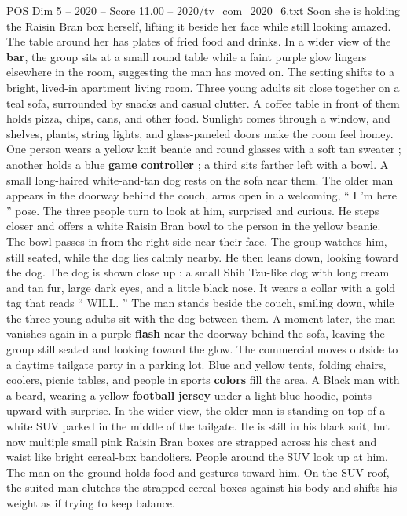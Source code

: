 \begin{textsample}{POS Dim 5 – 2020 – Score 11.00 – 2020/tv\_com\_2020\_6.txt}
Soon she is holding the Raisin Bran box herself, lifting it beside her face while still looking amazed.
The table around her has plates of fried food and drinks.
In a wider view of the \textbf{bar}, the group sits at a small round table while a faint purple glow lingers elsewhere in the room, suggesting the man has moved on.
The setting shifts to a bright, lived-in apartment living room.
Three young adults sit close together on a teal sofa, surrounded by snacks and casual clutter.
A coffee table in front of them holds pizza, chips, cans, and other food.
Sunlight comes through a window, and shelves, plants, string lights, and glass-paneled doors make the room feel homey.
One person wears a yellow knit beanie and round glasses with a soft tan sweater ; another holds a blue \textbf{game} \textbf{controller} ; a third sits farther left with a bowl.
A small long-haired white-and-tan dog rests on the sofa near them.
The older man appears in the doorway behind the couch, arms open in a welcoming, “ I ’m here ” pose.
The three people turn to look at him, surprised and curious.
He steps closer and offers a white Raisin Bran bowl to the person in the yellow beanie.
The bowl passes in from the right side near their face.
The group watches him, still seated, while the dog lies calmly nearby.
He then leans down, looking toward the dog.
The dog is shown close up : a small Shih Tzu-like dog with long cream and tan fur, large dark eyes, and a little black nose.
It wears a collar with a gold tag that reads “ WILL. ” The man stands beside the couch, smiling down, while the three young adults sit with the dog between them.
A moment later, the man vanishes again in a purple \textbf{flash} near the doorway behind the sofa, leaving the group still seated and looking toward the glow.
The commercial moves outside to a daytime tailgate party in a parking lot.
Blue and yellow tents, folding chairs, coolers, picnic tables, and people in sports \textbf{colors} fill the area.
A Black man with a beard, wearing a yellow \textbf{football} \textbf{jersey} under a light blue hoodie, points upward with surprise.
In the wider view, the older man is standing on top of a white SUV parked in the middle of the tailgate.
He is still in his black suit, but now multiple small pink Raisin Bran boxes are strapped across his chest and waist like bright cereal-box bandoliers.
People around the SUV look up at him.
The man on the ground holds food and gestures toward him.
On the SUV roof, the suited man clutches the strapped cereal boxes against his body and shifts his weight as if trying to keep balance.

\end{textsample}
